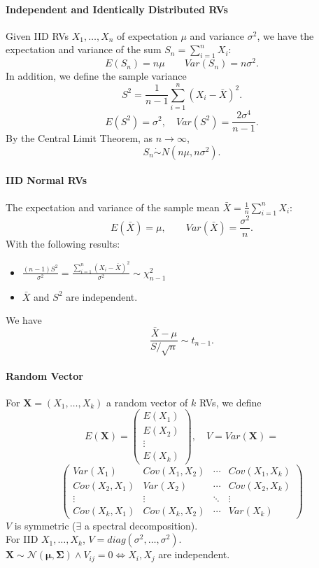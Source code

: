 \paragraph{Independent and Identically Distributed RVs}
Given IID RVs $X_1,\ldots,X_{n}$ of expectation $\mu$ and variance
$\sigma^{2}$, we have the \textcolor{Bittersweet}{expectation and variance} of the sum
$S_{n}=\sum_{i=1}^{n} X_i$:
\[ E(S_{n})=n\mu\qquad Var(S_{n})=n\sigma^{2}.\]
In addition, we define the \textcolor{Bittersweet}{sample variance}
\[S^{2}=\frac{1}{n-1}\sum_{i=1}^{n} {\left( X_i-\bar{X} \right)}^{2}.\] 
\[E\left( S^{2} \right)=\sigma^{2},\quad Var\left(S^{2}\right)=\frac{2\sigma^{4}}{n-1}.\] 
By the \textcolor{Bittersweet}{Central Limit Theorem}, as $n\to \infty$,
\[S_{n} \dot\sim N(n\mu,n\sigma^{2}).\] 

\paragraph{IID Normal RVs}
The \textcolor{Bittersweet}{expectation and variance} of the sample mean
$\bar{X}=\frac{1}{n}\sum_{i=1}^{n} X_i$:
\[E(\bar{X})=\mu,\qquad Var(\bar{X})=\frac{\sigma^{2}}{n}.\] 
With the following results:
\begin{itemize}
  \item $\frac{(n-1)S^{2}}{\sigma^{2}}=\frac{\sum_{i=1}^{n} {\left( X_i-\bar{X} \right) }^{2}}{\sigma^{2}}\sim\chi_{n-1}^{2}$
  \item $\bar{X}$ and $S^{2}$ are independent.
\end{itemize}
We have
\[\frac{\bar{X}-\mu}{S/\sqrt{n}}\sim t_{n-1}.\] 


\paragraph{Random Vector}
For $\mathbf{X}=\left( X_1,\ldots,X_k \right)$ a random vector of $k$ RVs,
we define
\[E(\mathbf{X})=\begin{pmatrix} E(X_1)\\E(X_2)\\\vdots\\E(X_k) \end{pmatrix},\quad V=Var(\mathbf{X})=\]
\[\begin{pmatrix} Var(X_1)&Cov(X_1,X_2)&\cdots&Cov(X_1,X_k)\\Cov(X_2,X_1)&Var(X_2)&\cdots&Cov(X_2,X_k)\\\vdots&\vdots&\ddots&\vdots\\Cov(X_k,X_1)&Cov(X_k,X_2)&\cdots&Var(X_k)\end{pmatrix}\]
$V$ is symmetric ($\exists$ a spectral decomposition).\\
For IID $X_1,\ldots,X_k$, $V=diag(\sigma^{2},\ldots,\sigma^{2})$.\\
$\mathbf{X}\sim \mathcal{N}\left( \mathbf{\mu},\mathbf{\Sigma} \right)\wedge
V_{ij}=0\iff \text{} X_i,X_j$ are independent.
